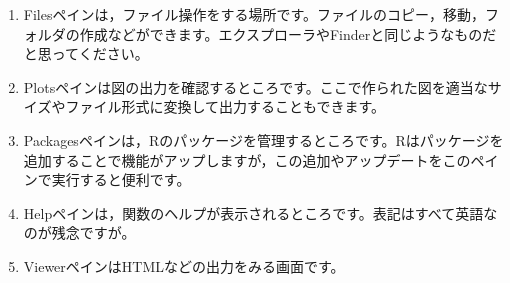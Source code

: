 \begin{enumerate}
	\item Filesペインは，ファイル操作をする場所です。ファイルのコピー，移動，フォルダの作成などができます。エクスプローラやFinderと同じようなものだと思ってください。
	\item Plotsペインは図の出力を確認するところです。ここで作られた図を適当なサイズやファイル形式に変換して出力することもできます。
	\item Packagesペインは，Rのパッケージを管理するところです。Rはパッケージを追加することで機能がアップしますが，この追加やアップデートをこのペインで実行すると便利です。
	\item Helpペインは，関数のヘルプが表示されるところです。表記はすべて英語なのが残念ですが。
	\item ViewerペインはHTMLなどの出力をみる画面です。
\end{enumerate}

